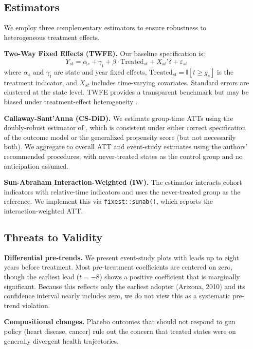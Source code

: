 \documentclass[12pt]{article}
\newcommand{\ind}{\mathbb{I}}
\begin{document}
\subsection{Estimators}

We employ three complementary estimators to ensure robustness to heterogeneous treatment effects.

\textbf{Two-Way Fixed Effects (TWFE).} Our baseline specification is:
\begin{equation}
Y_{st} = \alpha_s + \gamma_t + \beta \cdot \text{Treated}_{st} + X_{st}'\delta + \varepsilon_{st}
\end{equation}
where $\alpha_s$ and $\gamma_t$ are state and year fixed effects, $\text{Treated}_{st} = \ind[t \geq g_s]$ is the treatment indicator, and $X_{st}$ includes time-varying covariates. Standard errors are clustered at the state level. TWFE provides a transparent benchmark but may be biased under treatment-effect heterogeneity \citep{goodman2021difference}.

\textbf{Callaway-Sant'Anna (CS-DiD).} We estimate group-time ATTs using the doubly-robust estimator of \citet{callaway2021difference}, which is consistent under either correct specification of the outcome model or the generalized propensity score (but not necessarily both). We aggregate to overall ATT and event-study estimates using the authors' recommended procedures, with never-treated states as the control group and no anticipation assumed.

\textbf{Sun-Abraham Interaction-Weighted (IW).} The \citet{sunAbraham2021} estimator interacts cohort indicators with relative-time indicators and uses the never-treated group as the reference. We implement this via \texttt{fixest::sunab()}, which reports the interaction-weighted ATT.

\subsection{Threats to Validity}

\textbf{Differential pre-trends.} We present event-study plots with leads up to eight years before treatment. Most pre-treatment coefficients are centered on zero, though the earliest lead ($t = -8$) shows a positive coefficient that is marginally significant. Because this reflects only the earliest adopter (Arizona, 2010) and its confidence interval nearly includes zero, we do not view this as a systematic pre-trend violation.

\textbf{Compositional changes.} Placebo outcomes that should not respond to gun policy (heart disease, cancer) rule out the concern that treated states were on generally divergent health trajectories.
\end{document}
